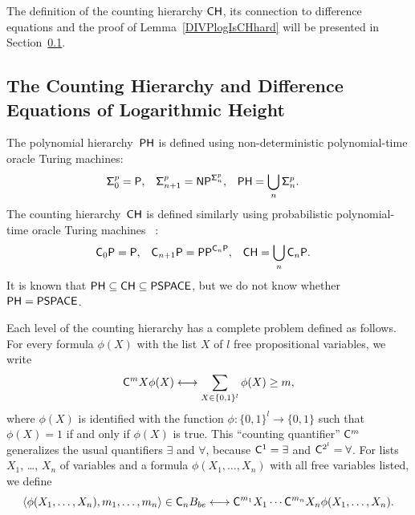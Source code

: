 The definition of the counting hierarchy $\mathsf{CH}$, 
its connection to difference equations and 
the proof of Lemma~\ref{DIVPlogIsCHhard} 
will be presented in Section~\ref{subsection: counting hierarchy}. 



\subsection{The Counting Hierarchy and Difference Equations of Logarithmic Height}
\label{subsection: counting hierarchy}

The polynomial hierarchy~$\mathsf{PH}$ is defined using non-deterministic polynomial-time oracle Turing machines: 
\begin{align}
 \mathsf{\Sigma}^p_0  &= \mathsf{P},
 &
 \mathsf{\Sigma}^p_{n+1} &= \mathsf{NP} ^{\mathsf{\Sigma}^p_n},
 &
 \mathsf{PH} &= \bigcup_n \mathsf{\Sigma}^p_n.
\end{align}
The counting hierarchy~$\mathsf{CH}$
is defined similarly
using probabilistic polynomial-time oracle Turing machines~%
\cite{wagner1986complexity,toran1991complexity}: 
\begin{align} \label{eq:CH}
 \mathsf{C}_0 \mathsf{P}  &= \mathsf{P},
 &
 \mathsf{C}_{n+1} \mathsf{P} &= \mathsf{PP}^{\mathsf{C}_n \mathsf{P}},
 &
 \mathsf{CH} &= \bigcup_n \mathsf{C}_n \mathsf{P}.
\end{align}
It is known that $\mathsf{PH} \subseteq \mathsf{CH} \subseteq \mathsf{PSPACE}$, 
but we do not know whether $\mathsf{PH} = \mathsf{PSPACE}$.


Each level of the counting hierarchy 
has a complete problem defined as follows.
For every formula $\phi(X)$ with the list $X$ of $l$ free propositional variables,
we write 
\begin{equation}
 \mathsf{C}^m X \phi(X) 
  \longleftrightarrow 
  \sum_{X \in \{0,1\}^l} \phi(X) \ge m,
\end{equation}
where $\phi(X)$ is identified with the function 
$\phi \colon \{0,1\}^l \to \{0,1\}$
such that $\phi(X) = 1$ if and only if $\phi(X)$ is true.
This ``counting quantifier'' $\mathsf{C} ^m$ generalizes 
the usual quantifiers $\exists$ and $\forall$, 
because $\mathsf{C}^1 = \exists$ and $\mathsf{C}^{2^l} = \forall$.
For lists $X _1$, \ldots, $X _n$ of variables 
and a formula $\phi(X_1, \dots, X_n)$ with all free variables listed, 
we define
\begin{equation}
 \langle \phi(X_1, \dots, X_n), m_1, \dots, m_n \rangle \in \mathsf{C}_n B_{be}
 \longleftrightarrow
 \mathsf{C}^{m_1}{X_1} \cdots \mathsf{C}^{m_n}{X_n} \phi(X_1, \dots, X_n).
\end{equation}

